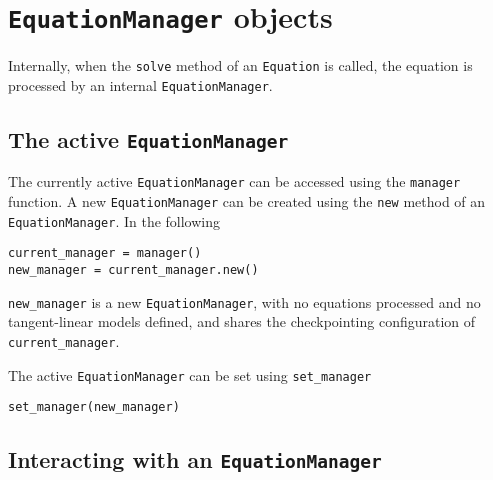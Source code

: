 \documentclass[11pt]{article}
\begin{document}
\section{\texttt{EquationManager} objects}\label{sect:EquationManager}

Internally, when the \texttt{solve} method of an \texttt{Equation} is called,
the equation is processed by an internal \texttt{EquationManager}.

\subsection{The active \texttt{EquationManager}}\label{sect:active_EquationManager}

The currently active \texttt{EquationManager} can be accessed using the
\texttt{manager} function. A new \texttt{EquationManager} can be created using
the \texttt{new} method of an \texttt{EquationManager}. In the following
\begin{lstlisting}
current_manager = manager()
new_manager = current_manager.new()
\end{lstlisting}
\texttt{new\_manager} is a new \texttt{EquationManager}, with no equations
processed and no tangent-linear models defined, and shares the checkpointing
configuration of \texttt{current\_manager}.

The active \texttt{EquationManager} can be set using
\texttt{set\_manager}
\begin{lstlisting}
set_manager(new_manager)
\end{lstlisting}

\subsection{Interacting with an \texttt{EquationManager}}
\end{document}
